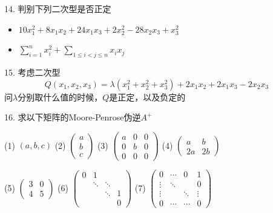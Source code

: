 \begin{frame}

14. 判别下列二次型是否正定
\begin{itemize}
\item[(1)] $10x_1^2 + 8x_1x_2 + 24x_1x_3 + 2x_2^2 - 28x_2x_3 + x_3^2$
\vspace{0.4em}
\item[(2)] $\sum\limits_{i=1}^n x_i^2 + \sum\limits_{1\le i<j\le n} x_ix_j$
\end{itemize}

\vspace{1em}

15. 考虑二次型
\[Q(x_1,x_2,x_3) = \lambda(x_1^2+x_2^2+x_3^2) + 2x_1x_2 + 2x_1x_3 - 2x_2x_3\]
问$\lambda$分别取什么值的时候，$Q$是正定，以及负定的

\end{frame}


\begin{frame}

16. 求以下矩阵的Moore-Penrose伪逆$A^+$

\vspace{0.5em}

(1) $(a,b,c)$ \quad (2) $\begin{pmatrix} a \\ b \\ c \end{pmatrix}$ \quad (3) $\begin{pmatrix} a & 0 & 0 \\ 0 & b & 0 \\ 0 & 0 & 0 \end{pmatrix}$ \quad (4) $\begin{pmatrix} a & b \\ 2a & 2b \end{pmatrix}$

\vspace{0.5em}

(5) $\begin{pmatrix} 3 & 0 \\ 4 & 5 \end{pmatrix}$ \quad (6) $\begin{pmatrix} 0 & 1 & & \\ & \ddots & \ddots & \\ & & \ddots & 1 \\ & & & 0 \end{pmatrix}$ \quad (7) $\begin{pmatrix} 0 & \cdots & 0 & 1 \\ \vdots & \ddots & & 0 \\ \vdots & & \ddots & \vdots \\ 0 & \cdots & \cdots & 0 \end{pmatrix}$

\end{frame}

